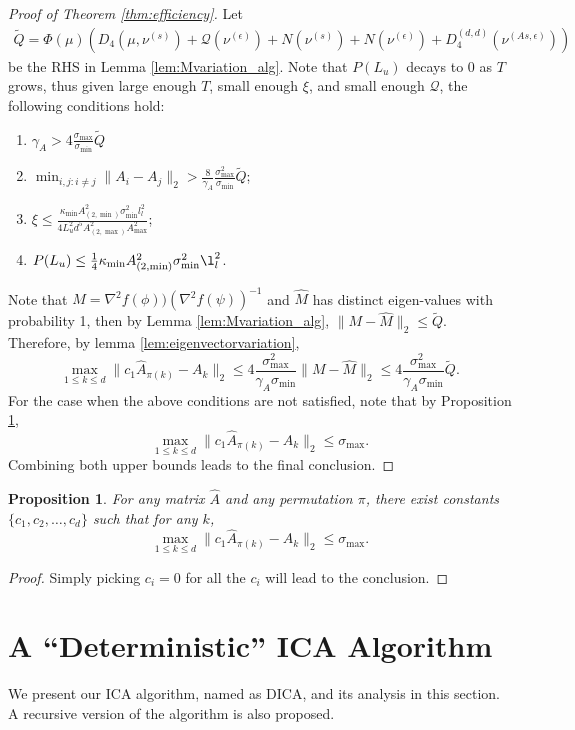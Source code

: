 \documentclass[11pt]{article}
\newcommand{\tQ}{\tilde{Q}}
\newcommand{\cQ}{\mathcal{Q}}
\newtheorem{prop}[thm]{Proposition}
\newcommand{\eps}{\epsilon}
\begin{document}
\begin{proof}[ Proof of Theorem  \ref{thm:efficiency}]
	Let 
	\begin{align*}
	\tQ =\Phi(\mu)\left( D_4(\mu, \nu^{(s)} )+ \cQ(\nu^{(\eps)}) + N(\nu^{(s)})+ N(\nu^{(\eps)})+ D_4^{(d,d)}(\nu^{(As,\eps)}) \right)
	\end{align*}
	be the RHS in Lemma \ref{lem:Mvariation_alg}.
	Note that $P(L_u)$ decays to 0 as $T$ grows, thus given large enough $T$, small enough $\xi$, and small enough $\cQ$, the following conditions hold:
	\begin{enumerate}
		\itemsep0em
		\item $\gamma_A > 4\frac{\sigma_{\max}}{\sigma_{\min}} \tQ$
		\item $\min_{i,j:i\neq j} \|A_i - A_j\|_2 > \frac{8}{\gamma_A}\frac{\sigma_{\max}^2}{\sigma_{\min}} \tQ$;
		\item $\xi \le  \frac{\kappa_{\min}A^2_{(2,\min)}\sigma_{\min}^2l_l^2}{4L_u^2d^5 A_{(2,\max)}^2A_{\max}^2}$;
		\item  $P(L_u) \le \frac{1}{4}\kappa_{\min}A^2_{(2,\min)}\sigma_{\min}^2\l_l^2$. 
	\end{enumerate}
	
	Note that $M = \nabla^2f(\phi))(\nabla^2f(\psi))^{-1}$ and $\hat{M}$ has distinct eigen-values with probability 1,  then by Lemma \ref{lem:Mvariation_alg}, $\|M-\hat{M}\|_2 \le \tQ$.
	Therefore, by lemma \ref{lem:eigenvectorvariation}, 
	\[
	\max_{1\le k\le d}\| c_1\widehat{A}_{\pi(k)} - A_k\|_2 \le 4 \frac{\sigma_{\max}^2}{\gamma_A \sigma_{\min}}\|M - \hat{M} \|_2 \le 4 \frac{\sigma_{\max}^2}{\gamma_A \sigma_{\min}} \tQ. 
	\]
	For the case when the above conditions are not satisfied, note that by Proposition \ref{prop:trivialres}, 
	\[
	\max_{1\le k\le d}\| c_1\widehat{A}_{\pi(k)} - A_k\|_2 \le\sigma_{\max}.
	\]
	Combining both upper bounds leads to the final conclusion.
\end{proof}
\begin{prop}
	\label{prop:trivialres}
	For any matrix $\hat{A}$ and any permutation $\pi$, there exist constants $\{c_1, c_2, \ldots, c_d\}$ such that for any $k$,
	\[
	\max_{1\le k\le d}\| c_1\hat{A}_{\pi(k)} - A_k\|_2 \le \sigma_{\max}.
	\]
\end{prop}
\begin{proof}
	Simply picking $c_i = 0$ for all the $c_i$ will lead to the conclusion.
\end{proof}

\section{A ``Deterministic'' ICA Algorithm}
\label{sec:DICA}
We present our ICA algorithm, named as DICA, and its analysis in this section. A recursive version of the algorithm is also proposed.
\end{document}

